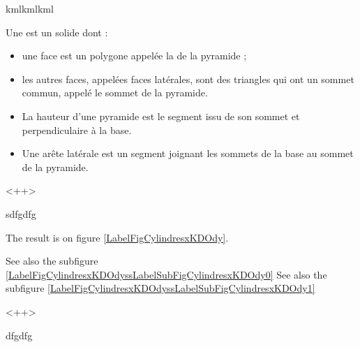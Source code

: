 
kmlkmlkml

\begin{definition}
    Une  est un solide dont :
    \begin{itemize}
        \item 
            une face est un polygone appelée la  de la pyramide ;
\item
les autres faces, appelées faces latérales, sont des triangles qui ont un sommet commun, appelé le sommet de la pyramide.
    \end{itemize}
\end{definition}


\begin{definition}
    \begin{itemize}
        \item 
La hauteur d'une pyramide est le segment issu de son sommet et perpendiculaire à la base.
\item
Une arête latérale est un segment joignant les sommets de la base au sommet de la pyramide.
    \end{itemize}
    <++>
\end{definition}

sdfgdfg



The result is on figure \ref{LabelFigCylindresxKDOdy}. %
\newcommand{\CaptionFigCylindresxKDOdy}{<+Type your caption here+>}

See also the subfigure \ref{LabelFigCylindresxKDOdyssLabelSubFigCylindresxKDOdy0}
See also the subfigure \ref{LabelFigCylindresxKDOdyssLabelSubFigCylindresxKDOdy1}

<++>



dfgdfg


